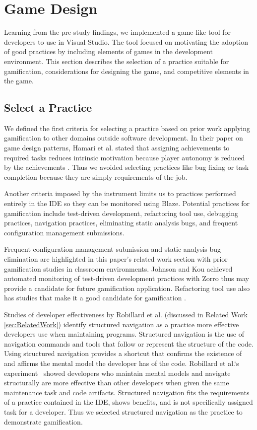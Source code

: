 \documentclass{sig-alternate}
\begin{document}
\section{Game Design}

Learning from the pre-study findings, we implemented a game-like tool for developers to use in Visual Studio.  The tool focused on motivating the adoption of good practices by including elements of games in the development environment.  This section describes the selection of a practice suitable for gamification, considerations for designing the game, and competitive elements in the game.

\subsection{Select a Practice}

We defined the first criteria for selecting a practice based on prior work  applying gamification to other domains outside software development. 
In their paper on game design patterns, Hamari et al. stated that assigning achievements to required tasks reduces intrinsic motivation because player autonomy is reduced by the achievements \cite{wbsnipes:Hamari2011Framework}.  Thus we avoided selecting practices like bug fixing or task completion because they are simply requirements of the job.  

Another criteria imposed by the instrument limits us to practices performed entirely in the IDE so they can be monitored using Blaze.  Potential practices for gamification include  test-driven development, refactoring tool use, debugging practices, navigation practices,  eliminating static analysis bugs, and frequent configuration management submissions.  

Frequent configuration management submission and static analysis bug elimination are highlighted in this paper's related work section with prior gamification studies in classroom environments.  Johnson and Kou achieved automated monitoring of test-driven development practices with Zorro \cite{V:Johnson2007Automated} thus may provide a candidate for future gamification application.   Refactoring tool use also has studies that make it a good candidate for gamification \cite{V:MurphyHill2012How,Moser2008Case}.

Studies of developer effectiveness by Robillard et al.\cite{wbsnipes:Robillard2004How} (discussed in Related Work \ref{sec:RelatedWork}) identify structured navigation as a practice more effective developers use when maintaining programs.  
Structured navigation is the use of navigation commands and tools that follow or represent the structure of the code.  Using structured navigation provides a shortcut that confirms the existence of and affirms the mental model the developer has of the code.  
Robillard et al.`s  experiment~\cite{wbsnipes:Robillard2004How} showed developers who maintain mental models and navigate structurally are more effective than other developers when given the same maintenance task and code artifacts.
Structured navigation fits the requirements of a practice contained in the IDE, shows benefits, and is not specifically assigned task for a developer.  Thus we selected structured navigation as the practice to demonstrate gamification.
\end{document}
